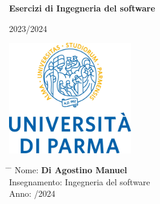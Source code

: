 \documentclass[12pt,a4paper]{article}
\title{}
\author{}
\date{}
\begin{document}
	
	\newcommand{\subf}[2]{%
		{\small\begin{tabular}[t]{@{}c@{}}
				#1\\#2
		\end{tabular}}%
	}
	
	\begin{titlepage}
		\begin{center}
			\vspace*{3cm}
			
			\Huge
			\textbf{Esercizi di Ingegneria del software}
			
			\vspace{0.3cm}
			\Huge
			2023/2024
			
			\vspace{0.8cm}
			\large
			
			
			
			\vspace{0.5cm}
			\LARGE
			
			
			\vspace{1.5cm}
			
			\textbf{}
            \includegraphics[width=0.4\textwidth]{unipr_logo.jpg}
			
			\vfill
			
			
			
			\vspace{0.8cm}
			
			
			
			\Large
			
			
			
			
		\end{center}
		\Large
		\begin{tabbing}
			\hspace*{1em}\= \hspace*{8em} \= \kill %
			\> Nome:\>  \textbf{Di Agostino Manuel} \\
			\> Insegnamento:\>  Ingegneria del software  \\
			\> Anno:  \> 2023/2024
		\end{tabbing}
		
	\end{titlepage}
	\clearpage
	
\end{document}
